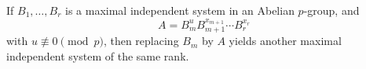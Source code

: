 If $B_1, \ldots, B_r$ is a maximal independent system in an Abelian $p$-group, and
$$A = B_m^u B_{m+1}^{x_{m+1}} \cdots B_r^{x_r}$$
with $u \not\equiv 0 \pmod{p}$, then replacing $B_m$ by $A$ yields another maximal independent system of the same rank.

